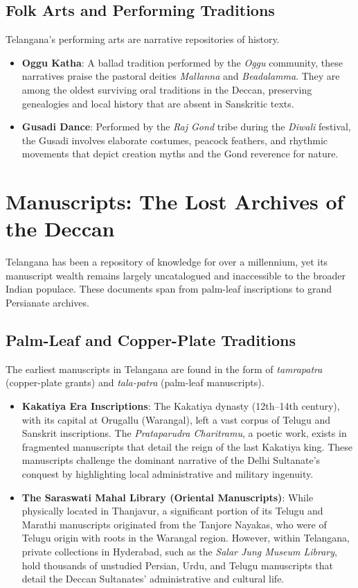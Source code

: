 \documentclass[12pt]{article}
\begin{document}
\subsection{Folk Arts and Performing Traditions}
Telangana’s performing arts are narrative repositories of history.
\begin{itemize}
    \item \textbf{Oggu Katha}: A ballad tradition performed by the \textit{Oggu} community, these narratives praise the pastoral deities \textit{Mallanna} and \textit{Beadalamma}. They are among the oldest surviving oral traditions in the Deccan, preserving genealogies and local history that are absent in Sanskritic texts.
    \item \textbf{Gusadi Dance}: Performed by the \textit{Raj Gond} tribe during the \textit{Diwali} festival, the Gusadi involves elaborate costumes, peacock feathers, and rhythmic movements that depict creation myths and the Gond reverence for nature.
\end{itemize}

\section{Manuscripts: The Lost Archives of the Deccan}
Telangana has been a repository of knowledge for over a millennium, yet its manuscript wealth remains largely uncatalogued and inaccessible to the broader Indian populace. These documents span from palm-leaf inscriptions to grand Persianate archives.

\subsection{Palm-Leaf and Copper-Plate Traditions}
The earliest manuscripts in Telangana are found in the form of \textit{tamrapatra} (copper-plate grants) and \textit{tala-patra} (palm-leaf manuscripts). 
\begin{itemize}
    \item \textbf{Kakatiya Era Inscriptions}: The Kakatiya dynasty (12th–14th century), with its capital at Orugallu (Warangal), left a vast corpus of Telugu and Sanskrit inscriptions. The \textit{Prataparudra Charitramu}, a poetic work, exists in fragmented manuscripts that detail the reign of the last Kakatiya king. These manuscripts challenge the dominant narrative of the Delhi Sultanate’s conquest by highlighting local administrative and military ingenuity. \cite{kakatiya}
    \item \textbf{The Saraswati Mahal Library (Oriental Manuscripts)}: While physically located in Thanjavur, a significant portion of its Telugu and Marathi manuscripts originated from the Tanjore Nayakas, who were of Telugu origin with roots in the Warangal region. However, within Telangana, private collections in Hyderabad, such as the \textit{Salar Jung Museum Library}, hold thousands of unstudied Persian, Urdu, and Telugu manuscripts that detail the Deccan Sultanates' administrative and cultural life. \cite{salarjung}
\end{itemize}
\end{document}
